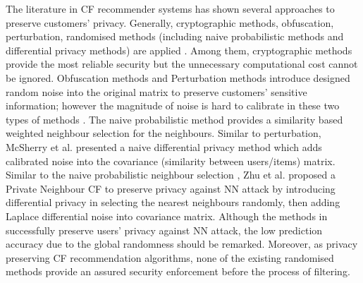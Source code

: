 \documentclass[11pt]{article}
\begin{document}
The literature in CF recommender systems has shown several approaches to preserve customers' privacy. Generally, cryptographic methods, obfuscation, perturbation, randomised methods (including naive probabilistic methods and differential privacy methods) are applied \cite{ZHU2014}. Among them, cryptographic methods \cite{ERKIN2010, NIKOLAENKO2013} provide the most reliable security but the unnecessary computational cost cannot be ignored. Obfuscation methods \cite{PARAMESWARAN2007, WEINSBERG2012} and Perturbation methods \cite{BASU2012, BILGE2012} introduce designed random noise into the original matrix to preserve customers' sensitive information; however the magnitude of noise is hard to calibrate in these two types of methods \cite{DWORK2006B, ZHU2014}. The naive probabilistic method \cite{ADAMOPOULOS2014} provides a similarity based weighted neighbour selection for the  neighbours. Similar to perturbation, McSherry et al. \cite{MCSHERRY2009} presented a naive differential privacy method which adds calibrated noise into the covariance (similarity between users/items) matrix. Similar to the naive probabilistic neighbour selection \cite{ADAMOPOULOS2014}, Zhu et al. \cite{ZHU2014} proposed a Private Neighbour CF to preserve privacy against NN attack by introducing differential privacy in selecting the  nearest neighbours randomly, then adding Laplace differential noise into covariance matrix. Although the methods in \cite{MCSHERRY2009, ZHU2014, ADAMOPOULOS2014} successfully preserve users' privacy against NN attack, the low prediction accuracy due to the global randomness should be remarked. Moreover, as privacy preserving CF recommendation algorithms, none of the existing randomised methods provide an assured security enforcement before the process of filtering.
\end{document}
